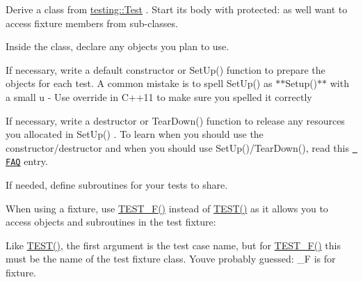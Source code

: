 \begin{DoxyEnumerate}
\item Derive a class from {\ttfamily \mbox{\hyperlink{classtesting_1_1Test}{testing\+::\+Test}}} . Start its body with {\ttfamily protected\+:} as we\textquotesingle{}ll want to access fixture members from sub-\/classes.
\end{DoxyEnumerate}
\begin{DoxyEnumerate}
\item Inside the class, declare any objects you plan to use.
\end{DoxyEnumerate}
\begin{DoxyEnumerate}
\item If necessary, write a default constructor or {\ttfamily Set\+Up()} function to prepare the objects for each test. A common mistake is to spell {\ttfamily Set\+Up()} as $\ast$$\ast${\ttfamily Setup()}$\ast$$\ast$ with a small {\ttfamily u} -\/ Use {\ttfamily override} in C++11 to make sure you spelled it correctly
\end{DoxyEnumerate}
\begin{DoxyEnumerate}
\item If necessary, write a destructor or {\ttfamily Tear\+Down()} function to release any resources you allocated in {\ttfamily Set\+Up()} . To learn when you should use the constructor/destructor and when you should use {\ttfamily Set\+Up()/\+Tear\+Down()}, read this \href{faq.md\#should-i-use-the-constructordestructor-of-the-test-fixture-or-setupteardown}{\texttt{ F\+AQ}} entry.
\end{DoxyEnumerate}
\begin{DoxyEnumerate}
\item If needed, define subroutines for your tests to share.
\end{DoxyEnumerate}

When using a fixture, use {\ttfamily \mbox{\hyperlink{gtest_8h_a0ee66d464d1a06c20c1929cae09d8758}{T\+E\+S\+T\+\_\+\+F()}}} instead of {\ttfamily \mbox{\hyperlink{gtest_8h_ad8b332753515c0ab8baada563c2547eb}{T\+E\+S\+T()}}} as it allows you to access objects and subroutines in the test fixture\+:


\begin{DoxyCode}{0}
\DoxyCodeLine{\}}
\end{DoxyCode}


Like {\ttfamily \mbox{\hyperlink{gtest_8h_ad8b332753515c0ab8baada563c2547eb}{T\+E\+S\+T()}}}, the first argument is the test case name, but for {\ttfamily \mbox{\hyperlink{gtest_8h_a0ee66d464d1a06c20c1929cae09d8758}{T\+E\+S\+T\+\_\+\+F()}}} this must be the name of the test fixture class. You\textquotesingle{}ve probably guessed\+: {\ttfamily \+\_\+F} is for fixture.

